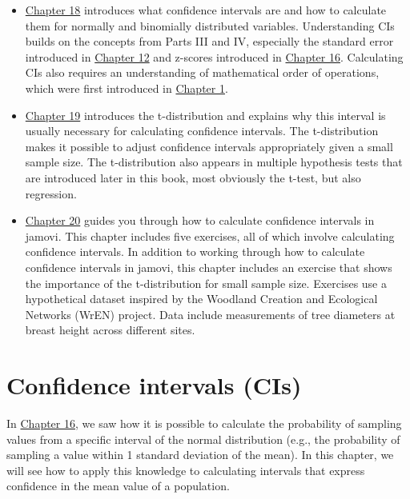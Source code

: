 \documentclass[
  openany]{scrbook}
\begin{document}
\begin{itemize}
\item
  \protect\hyperlink{Chapter_18}{Chapter 18} introduces what confidence intervals are and how to calculate them for normally and binomially distributed variables.
  Understanding CIs builds on the concepts from Parts III and IV, especially the standard error introduced in \protect\hyperlink{Chapter_12}{Chapter 12} and z-scores introduced in \protect\hyperlink{Chapter_16}{Chapter 16}.
  Calculating CIs also requires an understanding of mathematical order of operations, which were first introduced in \protect\hyperlink{Chapter_1}{Chapter 1}.
\item
  \protect\hyperlink{Chapter_19}{Chapter 19} introduces the t-distribution and explains why this interval is usually necessary for calculating confidence intervals.
  The t-distribution makes it possible to adjust confidence intervals appropriately given a small sample size.
  The t-distribution also appears in multiple hypothesis tests that are introduced later in this book, most obviously the t-test, but also regression.
\item
  \protect\hyperlink{Chapter_20}{Chapter 20} guides you through how to calculate confidence intervals in jamovi.
  This chapter includes five exercises, all of which involve calculating confidence intervals.
  In addition to working through how to calculate confidence intervals in jamovi, this chapter includes an exercise that shows the importance of the t-distribution for small sample size.
  Exercises use a hypothetical dataset inspired by the Woodland Creation and Ecological Networks (WrEN) project.
  Data include measurements of tree diameters at breast height across different sites.
\end{itemize}

\hypertarget{Chapter_18}{%
\chapter{Confidence intervals (CIs)}\label{Chapter_18}}

In \protect\hyperlink{Chapter_16}{Chapter 16}, we saw how it is possible to calculate the probability of sampling values from a specific interval of the normal distribution (e.g., the probability of sampling a value within 1 standard deviation of the mean).
In this chapter, we will see how to apply this knowledge to calculating intervals that express confidence in the mean value of a population.
\end{document}
